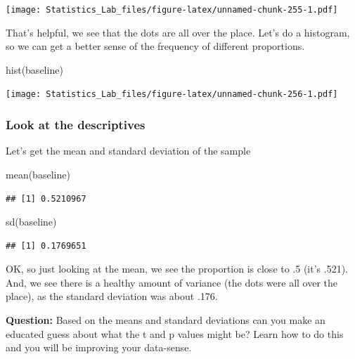 \documentclass[
]{book}
\newenvironment{Shaded}{\begin{snugshade}}{\end{snugshade}}
\newcommand{\FunctionTok}[1]{\textcolor[rgb]{0.00,0.00,0.00}{#1}}
\newcommand{\NormalTok}[1]{#1}
\begin{document}
\texttt{[image: Statistics\_Lab\_files/figure-latex/unnamed-chunk-255-1.pdf]}

That's helpful, we see that the dots are all over the place. Let's do a histogram, so we can get a better sense of the frequency of different proportions.

\begin{Shaded}
\begin{Highlighting}[]
\FunctionTok{hist}\NormalTok{(baseline)}
\end{Highlighting}
\end{Shaded}

\texttt{[image: Statistics\_Lab\_files/figure-latex/unnamed-chunk-256-1.pdf]}

\hypertarget{look-at-the-descriptives}{%
\subsubsection{Look at the descriptives}\label{look-at-the-descriptives}}

Let's get the mean and standard deviation of the sample

\begin{Shaded}
\begin{Highlighting}[]
\FunctionTok{mean}\NormalTok{(baseline)}
\end{Highlighting}
\end{Shaded}

\begin{verbatim}
## [1] 0.5210967
\end{verbatim}

\begin{Shaded}
\begin{Highlighting}[]
\FunctionTok{sd}\NormalTok{(baseline)}
\end{Highlighting}
\end{Shaded}

\begin{verbatim}
## [1] 0.1769651
\end{verbatim}

OK, so just looking at the mean, we see the proportion is close to .5 (it's .521). And, we see there is a healthy amount of variance (the dots were all over the place), as the standard deviation was about .176.

\textbf{Question:} Based on the means and standard deviations can you make an educated guess about what the t and p values might be? Learn how to do this and you will be improving your data-sense.
\end{document}
